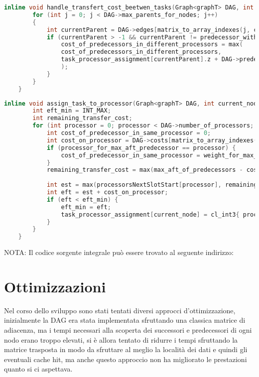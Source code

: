 \begin{lstlisting}[language=C++, caption={Funzione di gestione del costo di trasferimento dati tra task},captionpos=b]
	inline void handle_transfert_cost_beetwen_tasks(Graph<graphT> DAG, int current_node, int predecessor_with_max_aft, int max_aft_of_predecessors, int processor_for_max_aft_predecessor, int weight_for_max_aft_predecessor) {
		for (int j = 0; j < DAG->max_parents_for_nodes; j++)
		{
			int currentParent = DAG->edges[matrix_to_array_indexes(j, current_node, DAG->len)];
			if (currentParent > -1 && currentParent != predecessor_with_max_aft) {
				cost_of_predecessors_in_different_processors = max(
				cost_of_predecessors_in_different_processors,
				task_processor_assignment[currentParent].z + DAG->predecessors[matrix_to_array_indexes(j, current_node, DAG->len)]
				);
			}
		}
	}
\end{lstlisting}
\newpage
\begin{lstlisting}[language=C++, caption={Funzione che gestisce lo scheduling del task su un processore},captionpos=b]
	inline void assign_task_to_processor(Graph<graphT> DAG, int current_node, int max_aft_of_predecessors, int processor_for_max_aft_predecessor, int weight_for_max_aft_predecessor, int cost_of_predecessors_in_different_processors) {
		int eft_min = INT_MAX;
		int remaining_transfer_cost;
		for (int processor = 0; processor < DAG->number_of_processors; processor++) {
			int cost_of_predecessor_in_same_processor = 0;
			int cost_on_processor = DAG->costs[matrix_to_array_indexes(current_node, processor, DAG->number_of_processors)];
			if (processor_for_max_aft_predecessor == processor) {
				cost_of_predecessor_in_same_processor = weight_for_max_aft_predecessor;
			}
			remaining_transfer_cost = max(max_aft_of_predecessors - cost_of_predecessor_in_same_processor, cost_of_predecessors_in_different_processors);
			
			int est = max(processorsNextSlotStart[processor], remaining_transfer_cost);
			int eft = est + cost_on_processor;
			if (eft < eft_min) {
				eft_min = eft;
				task_processor_assignment[current_node] = cl_int3{ processor, est, eft };
			}
		}
	}
\end{lstlisting}

NOTA: Il codice sorgente integrale può essere trovato al seguente indirizzo: 

\section{Ottimizzazioni}
Nel corso dello sviluppo sono stati tentati diversi approcci d'ottimizzazione, inizialmente la DAG era stata implementata sfruttando una classica matrice di adiacenza, ma i tempi necessari alla scoperta dei successori e predecessori di ogni nodo erano troppo elevati, si è allora tentato di ridurre i tempi sfruttando la matrice trasposta in modo da sfruttare al meglio la località dei dati e quindi gli eventuali cache hit, ma anche questo approccio non ha migliorato le prestazioni quanto si ci aspettava.


